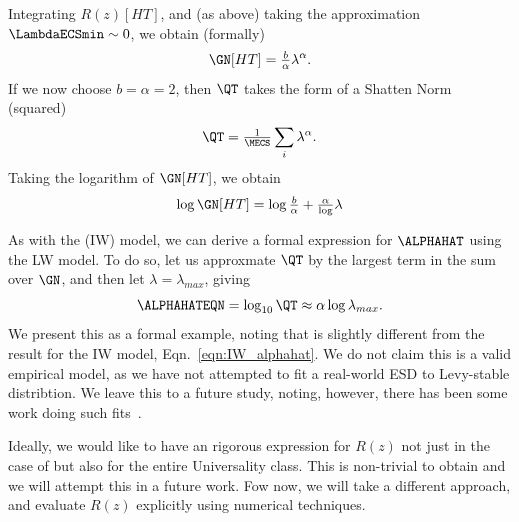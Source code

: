 Integrating $R(z)[HT]$, and (as above) taking the approximation $\LambdaECSmin\sim 0$, we obtain (formally)
\begin{equation}
\label{eqn:LW_model_1} 
\GN[HT] = \tfrac{b}{\alpha} \lambda^{\alpha}  .
\end{equation}
%
If we now choose $b=\alpha=2$, then  $\QT$ takes the form of a Shatten Norm (squared)
\begin{equation}
  \label{eqn:LW_model_2}
  \QT = \tfrac{1}{\MECS}\sum_{i}\lambda^{\alpha}  .
\end{equation}
%
Taking the logarithm of $\GN[HT] $, we obtain
\begin{equation}
\label{eqn:LW_model_3} 
\log \GN[HT] =  \log\tfrac{b}{\alpha} +\tfrac{\alpha}\log\lambda
\end{equation}

As with the \InverseWishart (IW) model, we can derive a formal expression for $\ALPHAHAT$ using the LW model.
To do so, let us approxmate $\QT$ by the largest term in the sum over $\GN$, and then let $\lambda=\lambda_{max}$, giving
\begin{equation} 
\label{eqn:LW_model_4} 
\ALPHAHATEQN = \log_{10} \QT \approx  \alpha\log\lambda_{max}   .
\end{equation}
We present this as a formal example, noting that is slightly different from the result for the IW model, Eqn.~\ref{eqn:IW_alphahat}. 
We do not claim this is a valid empirical model, as we have not attempted to fit a real-world ESD to Levy-stable distribtion.  
We leave this to a future study, noting, however, there has been some work doing such fits~\cite{li2024exploring}.

Ideally, we would like to have an rigorous expression for $R(z)$ not just
in the case of \IdealLearning but also for the entire \FatTailed Universality class.
This is non-trivial to obtain and we will attempt this in a future work.
Fow now, we will take a different approach, and evaluate $R(z)$ explicitly using numerical techniques.



